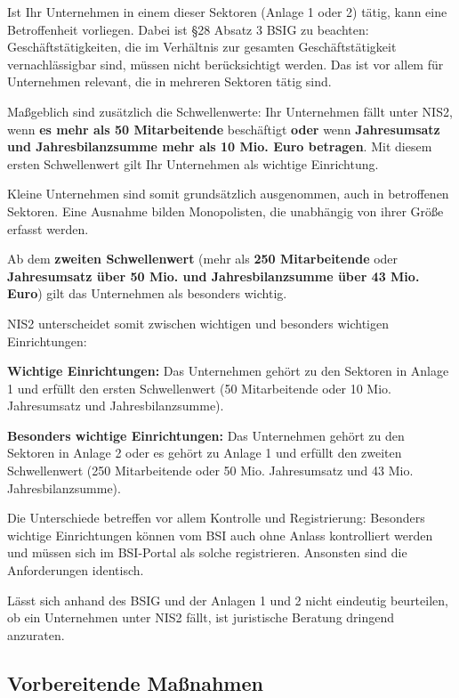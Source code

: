 Ist Ihr Unternehmen in einem dieser Sektoren (Anlage 1 oder 2) tätig, kann eine Betroffenheit vorliegen. Dabei ist §28 Absatz 3 BSIG zu beachten: Geschäftstätigkeiten, die im Verhältnis zur gesamten Geschäftstätigkeit vernachlässigbar sind, müssen nicht berücksichtigt werden. Das ist vor allem für Unternehmen relevant, die in mehreren Sektoren tätig sind.

Maßgeblich sind zusätzlich die Schwellenwerte: Ihr Unternehmen fällt unter NIS2, wenn \textbf{es mehr als 50 Mitarbeitende} beschäftigt \textbf{oder} wenn \textbf{Jahresumsatz und Jahresbilanzsumme mehr als 10 Mio. Euro betragen}. Mit diesem ersten Schwellenwert gilt Ihr Unternehmen als wichtige Einrichtung.

Kleine Unternehmen sind somit grundsätzlich ausgenommen, auch in betroffenen Sektoren. Eine Ausnahme bilden Monopolisten, die unabhängig von ihrer Größe erfasst werden.

Ab dem \textbf{zweiten Schwellenwert} (mehr als \textbf{250 Mitarbeitende} oder \textbf{Jahresumsatz über 50 Mio. und Jahresbilanzsumme über 43 Mio. Euro}) gilt das Unternehmen als besonders wichtig.


NIS2 unterscheidet somit zwischen wichtigen und besonders wichtigen Einrichtungen:

\textbf{Wichtige Einrichtungen:} Das Unternehmen gehört zu den Sektoren in Anlage 1 und erfüllt den ersten Schwellenwert (50 Mitarbeitende oder 10 Mio. \texteuro{} Jahresumsatz und Jahresbilanzsumme).

\textbf{Besonders wichtige Einrichtungen:} Das Unternehmen gehört zu den Sektoren in Anlage 2 oder es gehört zu Anlage 1 und erfüllt den zweiten Schwellenwert (250 Mitarbeitende oder 50 Mio. \texteuro{} Jahresumsatz und 43 Mio. \texteuro{} Jahresbilanzsumme).

Die Unterschiede betreffen vor allem Kontrolle und Registrierung: Besonders wichtige Einrichtungen können vom BSI auch ohne Anlass kontrolliert werden und müssen sich im BSI-Portal als solche registrieren. Ansonsten sind die Anforderungen identisch.

Lässt sich anhand des BSIG und der Anlagen 1 und 2 nicht eindeutig beurteilen, ob ein Unternehmen unter NIS2 fällt, ist juristische Beratung dringend anzuraten.


\newpage

\subsection{Vorbereitende Maßnahmen}

